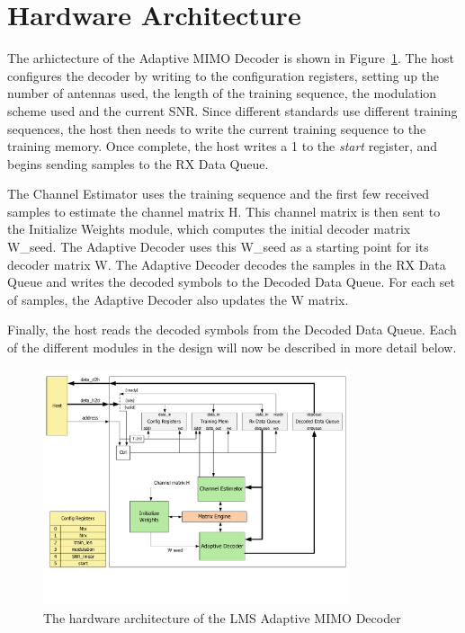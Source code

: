\documentclass[journal]{IEEEtran}
\begin{document}
\section{Hardware Architecture}

The arhictecture of the Adaptive MIMO Decoder is shown in Figure~\ref{top_level_arch}. The host configures the decoder by writing to the configuration registers, setting up the number of antennas used, the length of the training sequence, the modulation scheme used and the current SNR. Since different standards use different training sequences, the host then needs to write the current training sequence to the training memory. Once complete, the host writes a 1 to the {\em start} register, and begins sending samples to the RX Data Queue.

The Channel Estimator uses the training sequence and the first few received samples to estimate the channel matrix H. This channel matrix is then sent to the Initialize Weights module, which computes the initial decoder matrix W\_seed. The Adaptive Decoder uses this W\_seed as a starting point for its decoder matrix W. The Adaptive Decoder decodes the samples in the RX Data Queue and writes the decoded symbols to the Decoded Data Queue. For each set of samples, the Adaptive Decoder also updates the W matrix.

Finally, the host reads the decoded symbols from the Decoded Data Queue. Each of the different modules in the design will now be described in more detail below.

\begin{figure}[!h]
\centering
\includegraphics*[width=9cm, viewport = 0 90 789 600]{images/top_level_arch.pdf}
\caption{The hardware architecture of the LMS Adaptive MIMO Decoder}
\label{top_level_arch}
\end{figure}
\end{document}
